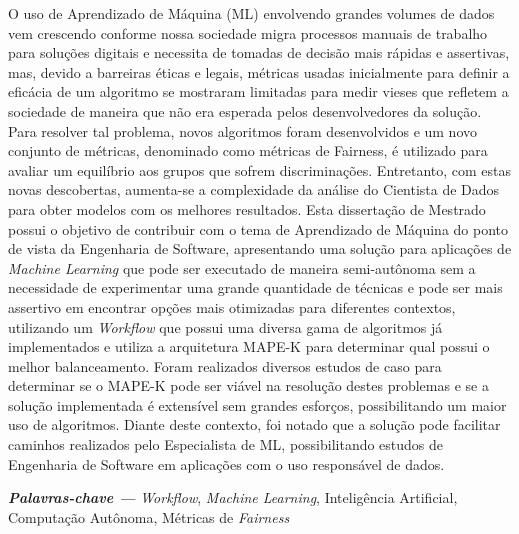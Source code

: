 \documentclass[portugues]{ic-tese}
\providecommand{\palavraschave}[1]
{
  \small	
  \textbf{\textit{Palavras-chave ---}} #1
}
\begin{document}
\begin{resumo}
O uso de Aprendizado de Máquina (ML) envolvendo grandes volumes de dados vem crescendo conforme nossa sociedade migra processos manuais de trabalho para soluções digitais e necessita de tomadas de decisão mais rápidas e assertivas, mas, devido a barreiras éticas e legais, métricas usadas inicialmente para definir a eficácia de um algoritmo se mostraram limitadas para medir vieses que refletem a sociedade de maneira que não era esperada pelos desenvolvedores da solução. Para resolver tal problema, novos algoritmos foram desenvolvidos e um novo conjunto de métricas, denominado como métricas de Fairness, é utilizado para avaliar um equilíbrio aos grupos que sofrem discriminações. Entretanto, com estas novas descobertas, aumenta-se a complexidade da análise do Cientista de Dados para obter modelos com os melhores resultados. Esta dissertação de Mestrado possui o objetivo de contribuir com o tema de Aprendizado de Máquina do ponto de vista da Engenharia de Software, apresentando uma solução para aplicações de \textit{Machine Learning} que pode ser executado de maneira semi-autônoma sem a necessidade de experimentar uma grande quantidade de técnicas e pode ser mais assertivo em encontrar opções mais otimizadas para diferentes contextos, utilizando um \textit{Workflow} que possui uma diversa gama de algoritmos já implementados e utiliza a arquitetura MAPE-K para determinar qual possui o melhor balanceamento. Foram realizados diversos estudos de caso para determinar se o MAPE-K pode ser viável na resolução destes problemas e se a solução implementada é extensível sem grandes esforços, possibilitando um maior uso de algoritmos. Diante deste contexto, foi notado que a solução pode facilitar caminhos realizados pelo Especialista de ML, possibilitando estudos de Engenharia de Software em aplicações com o uso responsável de dados.

\palavraschave{\textit{Workflow}, \textit{Machine Learning}, Inteligência Artificial, Computação Autônoma, Métricas de \textit{Fairness}}
\end{resumo}
\end{document}
